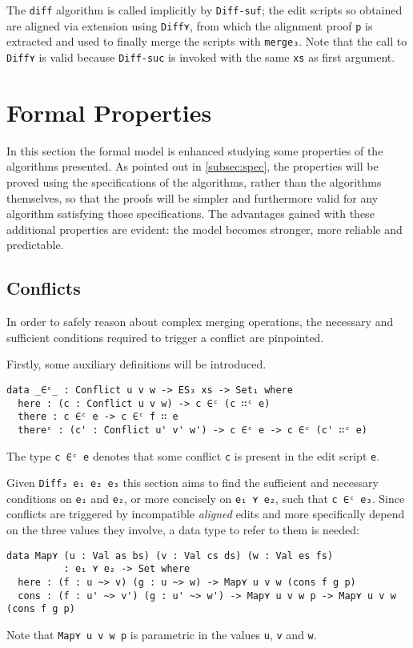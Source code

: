 \documentclass[../Thesis.tex]{subfiles}
\begin{document}
	The \texttt{diff} algorithm is called implicitly by \texttt{Diff-suf}; the
	edit scripts so obtained are aligned via extension using 
	\texttt{Diff⋎}, from which the alignment proof \texttt{p} is extracted
	and used to finally merge the scripts with \texttt{merge₃}.
	Note that the call to \texttt{Diff⋎} is valid because \texttt{Diff-suc}
	is invoked with the same \texttt{xs} as first argument.
	
\section{Formal Properties}
\label{sec:FormalProp}
In this section the formal model is enhanced studying some properties of the algorithms presented. As pointed out in \ref{subsec:spec}, the 
properties will be proved using the specifications of the algorithms, rather
than the algorithms themselves, so that the proofs will be simpler and 
furthermore valid for any algorithm satisfying those specifications.
The advantages gained with these additional properties
are evident: the model becomes stronger, more reliable and predictable.

	\subsection{Conflicts}
	\label{subsec:conflicts}
		In order to safely reason about complex merging operations, 
		the necessary and sufficient conditions required to trigger a conflict are 
		pinpointed.

		Firstly, some auxiliary definitions will be introduced.
\begin{verbatim}
data _∈ᶜ_ : Conflict u v w -> ES₃ xs -> Set₁ where
  here : (c : Conflict u v w) -> c ∈ᶜ (c ∷ᶜ e)
  there : c ∈ᶜ e -> c ∈ᶜ f ∷ e
  thereᶜ : (c' : Conflict u' v' w') -> c ∈ᶜ e -> c ∈ᶜ (c' ∷ᶜ e)
\end{verbatim}

		The type \texttt{c ∈ᶜ e} denotes that some conflict \texttt{c}
		is present in the edit script \texttt{e}.

		Given \texttt{Diff₃ e₁ e₂ e₃} this section aims to find the sufficient and 
		necessary conditions on \texttt{e₁} and \texttt{e₂}, or more concisely
		on \texttt{e₁ ⋎ e₂}, such that \texttt{c ∈ᶜ e₃}.	
		Since conflicts are triggered by incompatible \emph{aligned} edits
		and more specifically depend on the three values they involve,
		a data type to refer to 	them is needed:
\begin{verbatim}
data Map⋎ (u : Val as bs) (v : Val cs ds) (w : Val es fs) 
          : e₁ ⋎ e₂ -> Set where
  here : (f : u ~> v) (g : u ~> w) -> Map⋎ u v w (cons f g p) 
  cons : (f : u' ~> v') (g : u' ~> w') -> Map⋎ u v w p -> Map⋎ u v w (cons f g p)
\end{verbatim}
	Note that \texttt{Map⋎ u v w p} is parametric in the values \texttt{u}, 
	\texttt{v} and \texttt{w}.
		
\end{document}
